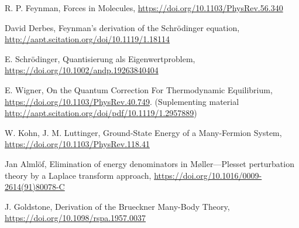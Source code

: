 \item
  R. P. Feynman,
  Forces in Molecules,
  \url{https://doi.org/10.1103/PhysRev.56.340}

\item
  David Derbes,
  Feynman’s derivation of the Schrödinger equation,
  \url{http://aapt.scitation.org/doi/10.1119/1.18114}

\item
  E. Schrödinger,
  Quantisierung als Eigenwertproblem,
  \url{https://doi.org/10.1002/andp.19263840404}

\item
  E. Wigner,
  On the Quantum Correction For Thermodynamic Equilibrium,
  \url{https://doi.org/10.1103/PhysRev.40.749}.
  (Suplementing material \url{http://aapt.scitation.org/doi/pdf/10.1119/1.2957889})

\item
  W. Kohn, J. M. Luttinger,
  Ground-State Energy of a Many-Fermion System,
  \url{https://doi.org/10.1103/PhysRev.118.41}

\item
  Jan Almlöf,
  Elimination of energy denominators in Møller—Plesset perturbation theory by a Laplace transform approach,
  \url{https://doi.org/10.1016/0009-2614(91)80078-C}

\item
  J. Goldstone,
  Derivation of the Brueckner Many-Body Theory,
  \url{https://doi.org/10.1098/rspa.1957.0037}

